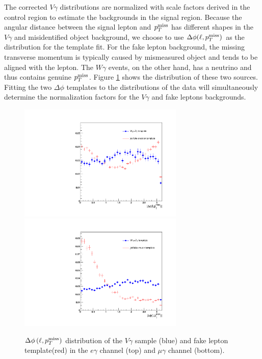 \documentclass[thesis.tex]{subfiles}
\renewcommand\_{\textunderscore\allowbreak}
\begin{document}
The corrected $V\gamma$ distributions are normalized with scale factors derived in the control region to estimate the backgrounds in the signal region. 
Because the angular distance between the signal lepton and $p_T^\textrm{miss}$ has different shapes in the $V\gamma$ and misidentified object background, we choose to use $\Delta\phi(\ell,p_T^\textrm{miss})$ as the distribution for the template fit. For the fake lepton background, the missing transverse momentum is typically caused by mismeasured object and tends to be aligned with the lepton. The $W\gamma$ events, on the other hand, has a neutrino and thus contains genuine $p_T^\textrm{miss}$. Figure \ref{fig:dphitemplate} shows the distribution of these two sources. Fitting the two $\Delta\phi$ templates to the distributions of the data will simultaneously determine the normalization factors for the $V\gamma$ and fake leptons backgrounds. 

\begin{figure}[hbtp]
    \begin{center}
    \includegraphics[width=0.7\textwidth]{Figures/dphiTemplate_eg.pdf} \\
    \includegraphics[width=0.7\textwidth]{Figures/dphiTemplate_mg.pdf}
    \end{center}
  \caption{$\Delta\phi\left(\ell,p_T^\textrm{miss}\right)$ distribution of the $V\gamma$ sample (blue) and fake lepton template(red) in the $e\gamma$ channel (top) and $\mu\gamma$ channel (bottom). }
    \label{fig:dphitemplate}
\end{figure}
\end{document}
